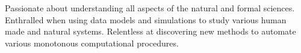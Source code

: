

\begin{cvparagraph}

Passionate about understanding all aspects of the natural and formal sciences. Enthralled when using data models and simulations to study various human made and natural systems. Relentless at discovering new methods to automate various monotonous computational procedures.

\vspace{-0.4cm}

\end{cvparagraph}

